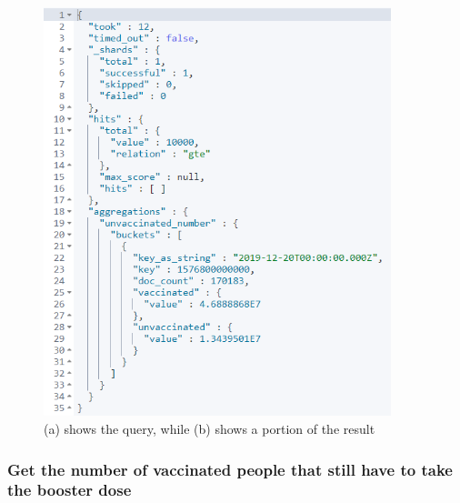 \documentclass{article}[IEEEtran]
\begin{document}
\begin{figure}[H]
\begin{center}
\begin{minipage}[b]{0.4\textwidth}
    \includegraphics[width=0.9\textwidth, frame]{Answer_Query_7.PNG}
     \subcaption{}
  \end{minipage}
  \caption{(a) shows the query, while (b) shows a portion of the result}
\end{center}
\end{figure}

\subsubsection{Get the number of vaccinated people that still have to take the booster dose}\label{ssec:q8}
\end{document}

